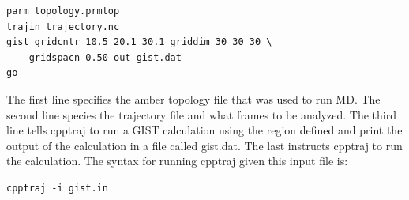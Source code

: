 \documentclass[9pt,tutorial]{livecoms}
\newcommand{\todo}{\textcolor{red}}
\begin{document}
\begin{lstlisting}
parm topology.prmtop
trajin trajectory.nc
gist gridcntr 10.5 20.1 30.1 griddim 30 30 30 \
	gridspacn 0.50 out gist.dat
go
\end{lstlisting}

The first line specifies the amber topology file that was used to run MD. The second line species the trajectory file and what frames to be analyzed. The third line tells cpptraj to run a GIST calculation using the region defined and print the output of the calculation in a file called gist.dat. The last instructs cpptraj to run the calculation. The syntax for running cpptraj given this input file is:

\begin{lstlisting}
cpptraj -i gist.in
\end{lstlisting}

\end{document}
